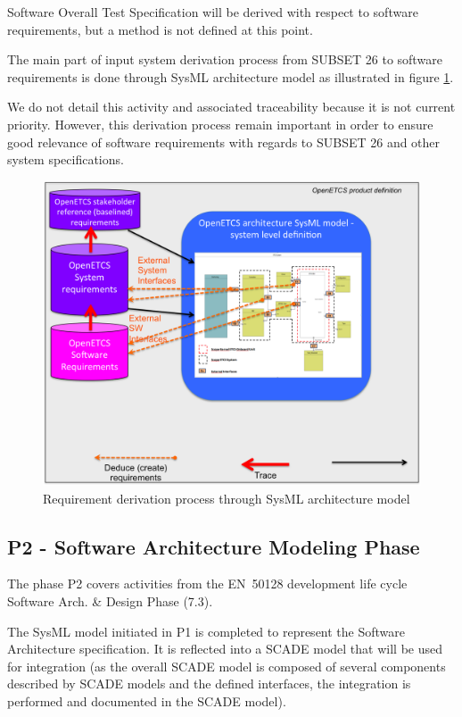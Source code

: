 \documentclass[11pt]{template/openetcs_report}
\begin{document}
Software Overall Test Specification will be derived with respect to software requirements, but a method is not defined at this point.

The main part of input system derivation process from SUBSET 26 to software requirements is done through SysML architecture model as illustrated in figure \ref{fig:P1RequirementDerivationWithSysMLModel}.
 
We do not detail this activity and associated traceability because it is not current priority. However, this derivation process remain important in order to ensure good relevance of software requirements with regards to SUBSET 26 and other system specifications.

\begin{figure}[htbp]
\centering
\includegraphics[width=.9\linewidth]
{./images/P1RequirementDerivationWithSysMLModel.png}
\caption{\label{fig:P1RequirementDerivationWithSysMLModel}Requirement derivation process through SysML architecture model}
\end{figure}


\subsection{P2 - Software Architecture Modeling Phase}
The phase P2 covers activities from the EN~50128 development life cycle Software Arch. \& Design Phase (7.3).

The SysML model initiated in P1 is completed to represent the Software Architecture specification. It is reflected into a SCADE model that will be used for integration (as the overall SCADE model is composed of several components described by SCADE models and the defined interfaces, the integration is performed and documented in the SCADE model).
\end{document}
